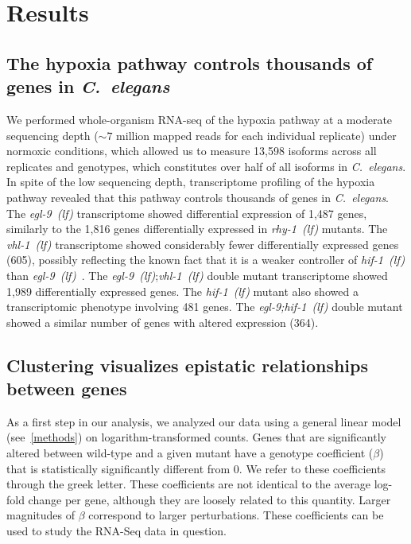 \documentclass[9pt,twocolumn,twoside]{pnas-new}
\newcommand{\cel}{\emph{C.~elegans}}
\newcommand{\egl}{\emph{egl-9~(lf)}}
\newcommand{\rhy}{\emph{rhy-1~(lf)}}
\newcommand{\vhl}{\emph{vhl-1~(lf)}}
\newcommand{\eglhif}{\emph{egl-9;hif-1~(lf)}}
\newcommand{\hif}{\emph{hif-1~(lf)}}
\newcommand{\egln}{1,487}
\newcommand{\rhyn}{1,816}
\newcommand{\vhln}{605}
\newcommand{\eglvhln}{1,989}
\newcommand{\hifn}{481}
\newcommand{\eglhifn}{364}
\begin{document}
\section*{Results}
\subsection*{The hypoxia pathway controls thousands of genes in \cel{}}
\label{sub:summary}

We performed whole-organism RNA-seq of the hypoxia pathway at a moderate
sequencing depth ($\sim7$ million mapped reads for each individual replicate) under
normoxic conditions, which allowed us to measure 13,598 isoforms across all
replicates and genotypes, which constitutes over half of all isoforms in \cel{}.
In spite of the low sequencing depth, transcriptome profiling of the hypoxia
pathway revealed that this pathway controls thousands of genes in \cel{}. The
\egl{} transcriptome showed differential expression of \egln{} genes, similarly to
the \rhyn{} genes differentially expressed in \rhy{} mutants. The \vhl{}
transcriptome showed considerably fewer differentially expressed genes (\vhln{}),
possibly reflecting the known fact that it is a weaker controller of \hif{} than
\egl{}~\cite{Shao2009}. The \egl{};\vhl{} double mutant transcriptome showed
\eglvhln{} differentially expressed genes. The \hif{} mutant also showed a
transcriptomic phenotype involving \hifn{} genes. The \eglhif{} double mutant
showed a similar number of genes with altered expression (\eglhifn{}).

\subsection*{Clustering visualizes epistatic relationships between genes}
\label{sub:Clustering}

As a first step in our analysis, we analyzed our data using a general
linear model (see~\ref{methods}) on logarithm-transformed
counts. Genes that are significantly altered between wild-type and a given
mutant have a genotype coefficient ($\beta$) that is statistically significantly
different from 0. We refer to these coefficients through the greek letter. These
coefficients are not identical to the average log-fold change per gene, although
they are loosely related to this quantity. Larger magnitudes of $\beta$
correspond to larger perturbations. These coefficients can be used to study the
RNA-Seq data in question.
\end{document}
